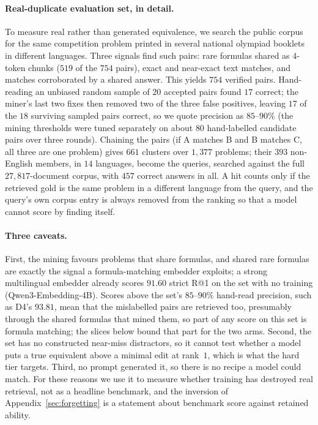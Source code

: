 \paragraph{Real-duplicate evaluation set, in detail.}
To measure real rather than generated equivalence, we search the public corpus for the same competition problem printed in several national olympiad booklets in different languages. Three signals find such pairs: rare formulas shared as $4$-token chunks ($519$ of the $754$ pairs), exact and near-exact text matches, and matches corroborated by a shared answer. This yields $754$ verified pairs. Hand-reading an unbiased random sample of $20$ accepted pairs found $17$ correct; the miner's last two fixes then removed two of the three false positives, leaving $17$ of the $18$ surviving sampled pairs correct, so we quote precision as $85$--$90\%$ (the mining thresholds were tuned separately on about $80$ hand-labelled candidate pairs over three rounds). Chaining the pairs (if A matches B and B matches C, all three are one problem) gives $661$ clusters over $1{,}377$ problems; their $393$ non-English members, in $14$ languages, become the queries, searched against the full $27{,}817$-document corpus, with $457$ correct answers in all. A hit counts only if the retrieved gold is the same problem in a different language from the query, and the query's own corpus entry is always removed from the ranking so that a model cannot score by finding itself.

\paragraph{Three caveats.}First, the mining favours problems that share formulas, and shared rare formulas are exactly the signal a formula-matching embedder exploits; a strong multilingual embedder already scores $91.60$ strict R@1 on the set with no training (Qwen3-Embedding-4B). Scores above the set's $85$--$90\%$ hand-read precision, such as D4's $93.81$, mean that the mislabelled pairs are retrieved too, presumably through the shared formulas that mined them, so part of any score on this set is formula matching; the slices below bound that part for the two arms. Second, the set has no constructed near-miss distractors, so it cannot test whether a model puts a true equivalent above a minimal edit at rank~$1$, which is what the hard tier targets. Third, no prompt generated it, so there is no recipe a model could match. For these reasons we use it to measure whether training has destroyed real retrieval, not as a headline benchmark, and the inversion of Appendix~\ref{sec:forgetting} is a statement about benchmark score against retained ability.


